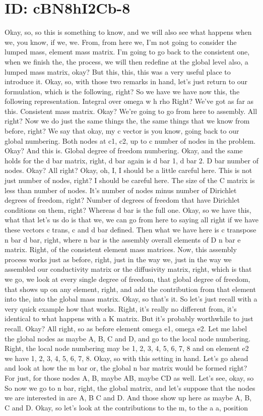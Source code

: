 \documentclass[10pt]{article}
\begin{document}
\section*{ID: cBN8hI2Cb-8}
Okay, so, so this is something to know, and we will also see what happens when we, you know, if we, we. From, from here we, I'm not going to consider the lumped mass, element mass matrix. I'm going to go back to the consistent one, when we finish the, the process, we will then redefine at the global level also, a lumped mass matrix, okay? But this, this, this was a very useful place to introduce it. Okay, so, with those two remarks in hand, let's just return to our formulation, which is the following, right? So we have we have now this, the following representation. Integral over omega w h rho Right? We've got as far as this. Consistent mass matrix. Okay? We're going to go from here to assembly. All right? Now we do just the same things the, the same things that we know from before, right? We say that okay, my c vector is you know, going back to our global numbering. Both nodes at c1, c2, up to c number of nodes in the problem. Okay? And this is. Global degree of freedom numbering. Okay, and the same holds for the d bar matrix, right, d bar again is d bar 1, d bar 2. D bar number of nodes. Okay? All right? Okay, oh, I, I should be a little careful here. This is not just number of nodes, right? I should be careful here. The size of the C matrix is less than number of nodes. It's number of nodes minus number of Dirichlet degrees of freedom, right? Number of degrees of freedom that have Dirichlet conditions on them, right? Whereas d bar is the full one. Okay, so we have this, what that let's us do is that we, we can go from here to saying all right if we have these vectors c trans, c and d bar defined. Then what we have here is c transpose n bar d bar, right, where n bar is the assembly overall elements of D n bar e matrix. Right, of the consistent element mass matrices. Now, this assembly process works just as before, right, just in the way we, just in the way we assembled our conductivity matrix or the diffusivity matrix, right, which is that we go, we look at every single degree of freedom, that global degree of freedom, that shows up on any element, right, and add the contribution from that element into the, into the global mass matrix. Okay, so that's it. So let's just recall with a very quick example how that works. Right, it's really no different from, it's identical to what happens with a K matrix. But it's probably worthwhile to just recall. Okay? All right, so as before element omega e1, omega e2. Let me label the global nodes as maybe A, B, C and D, and go to the local node numbering. Right, the local node numbering may be 1, 2, 3, 4, 5, 6, 7, 8 and on element e2 we have 1, 2, 3, 4, 5, 6, 7, 8. Okay, so with this setting in hand. Let's go ahead and look at how the m bar or, the global n bar matrix would be formed right? For just, for those nodes A, B, maybe AB, maybe CD as well. Let's see, okay, so So now we go to n bar, right, the global matrix, and let's suppose that the nodes we are interested in are A, B C and D. And those show up here as maybe A, B, C and D. Okay, so let's look at the contributions to the m, to the a a, position 
\end{document}
